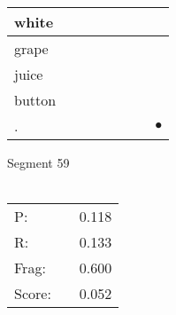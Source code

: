 \documentclass[landscape]{article}
\newcommand{\ssp}{\hspace{2pt}}
\newcommand{\mex}{\cellcolor{g}$\bullet$}
\begin{document}
\begin{tabular}{|l|p{10pt}|p{10pt}|p{10pt}|p{10pt}|p{10pt}|p{10pt}|p{10pt}|}
\hline
\ssp white \ssp&\hspace{2pt}&\hspace{2pt}&\hspace{2pt}&\hspace{2pt}&\hspace{2pt}&\hspace{2pt}&\hspace{2pt}\\
\hline
\ssp grape \ssp&\hspace{2pt}&\hspace{2pt}&\hspace{2pt}&\hspace{2pt}&\hspace{2pt}&\hspace{2pt}&\hspace{2pt}\\
\hline
\ssp juice \ssp&\hspace{2pt}&\hspace{2pt}&\hspace{2pt}&\hspace{2pt}&\hspace{2pt}&\hspace{2pt}&\hspace{2pt}\\
\hline
\ssp button \ssp&\hspace{2pt}&\hspace{2pt}&\hspace{2pt}&\hspace{2pt}&\hspace{2pt}&\hspace{2pt}&\hspace{2pt}\\
\hline
\ssp \cellcolor{ref6}. \ssp&\hspace{2pt}&\hspace{2pt}&\hspace{2pt}&\hspace{2pt}&\hspace{2pt}&\hspace{2pt}&\hspace{2pt}\mex\\
\hline
\end{tabular}

\vspace{6pt}
\noindent Segment 59\\\\
\noindent\begin{tabular}{lm{12pt}r}
\hline
P:&&0.118\\
R:&&0.133\\
Frag:&&0.600\\
Score:&&0.052\\
\end{tabular}
\end{document}
